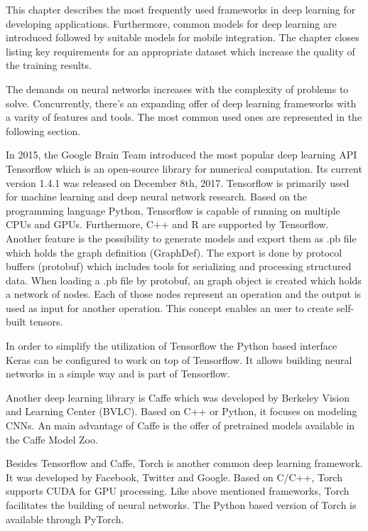 This chapter describes the most frequently used frameworks in deep learning for developing applications. Furthermore, common models for deep learning are introduced followed by suitable models for mobile integration. The chapter closes listing key requirements for an appropriate dataset which increase the quality of the training results.

The demands on neural networks increases with the complexity of problems to solve. Concurrently, there's an expanding offer of deep learning frameworks with a varity of features and tools. The most common used ones are represented in the following section.

In 2015, the Google Brain Team introduced the most popular deep learning API Tensorflow which is an open-source library for numerical computation. Its current version 1.4.1 was released on December 8th, 2017. Tensorflow is primarily used for machine learning and deep neural network research. Based on the programming language Python, Tensorflow is capable of running on multiple CPUs and GPUs. Furthermore, C++ and R are supported by Tensorflow. Another feature is the possibility to generate models and export them as .pb file which holds the graph definition (GraphDef). The export is done by protocol buffers (protobuf) which includes tools for serializing and processing structured data. When loading a .pb file by protobuf, an graph object is created which holds a network of nodes. Each of those nodes represent an operation and the output is used as input for another operation. This concept enables an user to create self-built tensors. 

In order to simplify the utilization of Tensorflow the Python based interface Keras can be configured to work on top of Tensorflow. It allows building neural networks in a simple way and is part of Tensorflow.

Another deep learning library is Caffe which was developed by Berkeley Vision and Learning Center (BVLC). Based on C++ or Python, it focuses on modeling CNNs. An main advantage of Caffe is the offer of pretrained models available in the Caffe Model Zoo. 

Besides Tensorflow and Caffe, Torch is another common deep learning framework. It was developed by Facebook, Twitter and Google. Based on C/C++, Torch supports CUDA for GPU processing. Like above mentioned frameworks, Torch facilitates the building of neural networks. The Python based version of Torch is available through PyTorch.
		
